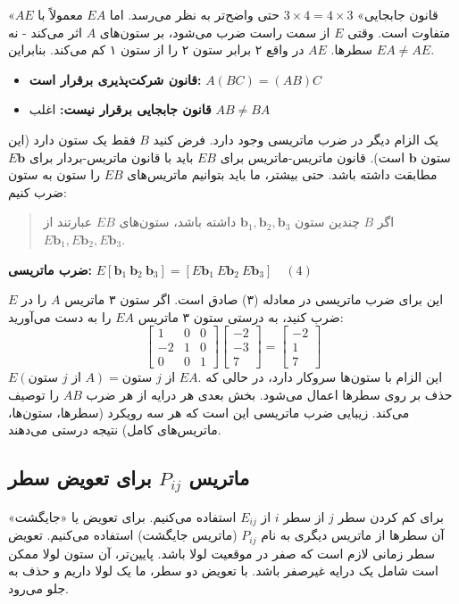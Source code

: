 \documentclass[12pt, a4paper]{book}
\begin{document}
	«قانون جابجایی» $3 \times 4 = 4 \times 3$ حتی واضح‌تر به نظر می‌رسد. اما $EA$ معمولاً با $AE$ متفاوت است. وقتی $E$ از سمت راست ضرب می‌شود، بر ستون‌های $A$ اثر می‌کند - نه سطرها. $AE$ در واقع ۲ برابر ستون ۲ را از ستون ۱ کم می‌کند. بنابراین $EA \neq AE$.
	
	\begin{itemize}
		\item \textbf{قانون شرکت‌پذیری برقرار است:} $A(BC) = (AB)C$
		\item \textbf{قانون جابجایی برقرار نیست:} اغلب $AB \neq BA$
	\end{itemize}
	
	یک الزام دیگر در ضرب ماتریسی وجود دارد. فرض کنید $B$ فقط یک ستون دارد (این ستون $\mathbf{b}$ است). قانون ماتریس-ماتریس برای $EB$ باید با قانون ماتریس-بردار برای $E\mathbf{b}$ مطابقت داشته باشد. حتی بیشتر، ما باید بتوانیم ماتریس‌های $EB$ را ستون به ستون ضرب کنیم:
	\begin{quote}
		اگر $B$ چندین ستون $\mathbf{b}_1, \mathbf{b}_2, \mathbf{b}_3$ داشته باشد، ستون‌های $EB$ عبارتند از $E\mathbf{b}_1, E\mathbf{b}_2, E\mathbf{b}_3$.
	\end{quote}
	\textbf{ضرب ماتریسی:} $E[\mathbf{b}_1 \ \mathbf{b}_2 \ \mathbf{b}_3] = [E\mathbf{b}_1 \ E\mathbf{b}_2 \ E\mathbf{b}_3] \quad (4)$
	
	این برای ضرب ماتریسی در معادله (۳) صادق است. اگر ستون ۳ ماتریس $A$ را در $E$ ضرب کنید، به درستی ستون ۳ ماتریس $EA$ را به دست می‌آورید:
	\[
	\begin{bmatrix} 1 & 0 & 0 \\ -2 & 1 & 0 \\ 0 & 0 & 1 \end{bmatrix}
	\begin{bmatrix} -2 \\ -3 \\ 7 \end{bmatrix}
	=
	\begin{bmatrix} -2 \\ 1 \\ 7 \end{bmatrix}
	\]
	$E(\text{ستون } j \text{ از } A) = \text{ستون } j \text{ از } EA$.
	این الزام با ستون‌ها سروکار دارد، در حالی که حذف بر روی سطرها اعمال می‌شود. بخش بعدی هر درایه از هر ضرب $AB$ را توصیف می‌کند. زیبایی ضرب ماتریسی این است که هر سه رویکرد (سطرها، ستون‌ها، ماتریس‌های کامل) نتیجه درستی می‌دهند.
	
	\subsection*{ماتریس $P_{ij}$ برای تعویض سطر}
	برای کم کردن سطر $j$ از سطر $i$ از $E_{ij}$ استفاده می‌کنیم. برای تعویض یا «جایگشت» آن سطرها از ماتریس دیگری به نام $P_{ij}$ (ماتریس جایگشت) استفاده می‌کنیم. تعویض سطر زمانی لازم است که صفر در موقعیت لولا باشد. پایین‌تر، آن ستون لولا ممکن است شامل یک درایه غیرصفر باشد. با تعویض دو سطر، ما یک لولا داریم و حذف به جلو می‌رود.
	
\end{document}
